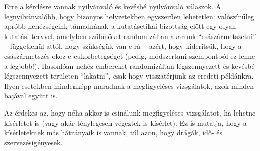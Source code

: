 \documentclass[magyar,]{book}
\begin{document}
Erre a kérdésre vannak nyilvánvaló és kevésbé nyilvánvaló válaszok. A legnyilvánvalóbb, hogy bizonyos helyzetekben egyszerűen lehetetlen: valószínűleg apróbb nehézségeink támadnának a kutatásetikai bizottság előtt egy olyan kutatási tervvel, amelyben szülőnőket randomizáltan akarunk \enquote{császármetszetni} -- függetlenül attól, hogy szükségük van-e rá -- azért, hogy kiderítsük, hogy a császármetszés okoz-e cukorbetegséget (pedig, módszertani szempontból ez lenne a legjobb!). Hasonlóan nehéz embereket randomizáltan légszennyezett és kevésbé légszennyezett területen \enquote{lakatni}, csak hogy visszatérjünk az eredeti példánkra. Ilyen esetekben mindenképp maradnak a megfigyeléses vizsgálatok, azok minden bajával együtt is.

Az érdekes az, hogy néha akkor is csinálunk megfigyeléses vizsgálatot, ha lehetne kísérletet is (vagy akár ténylegesen végeztek is kísérlet). Ez is mutatja, hogy a kísérleteknek más hátrányaik is vannak, túl azon, hogy drágák, idő- és szervezésigényesek.
\end{document}
